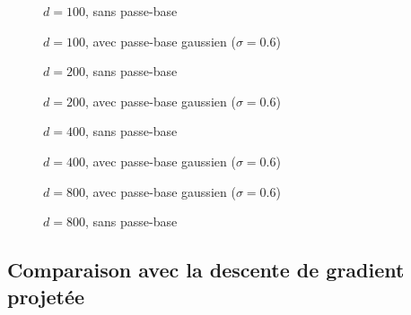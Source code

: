 \documentclass[hidelinks, french]{article} %
\theoremstyle{enonce}
\theoremstyle{special}
\theoremstyle{rq}
\theoremstyle{exo}
\theoremstyle{demo}
\begin{document}
\newpage

\begin{figure}[H]\centering
    \caption{$d=100$, sans passe-base}
    \label{fig:LGDlat100-s}
\end{figure}

\begin{figure}[H]\centering
	\caption{$d=100$, avec passe-base gaussien ($\sigma=0.6$)}
	\label{fig:LGDlat100-g}
\end{figure}

\begin{figure}[H]\centering
	\caption{$d=200$, sans passe-base}
	\label{fig:LGDlat200-s}
\end{figure}

\begin{figure}[H]\centering
	\caption{$d=200$, avec passe-base gaussien ($\sigma=0.6$)}
	\label{fig:LGDlat200-g}
\end{figure}

\begin{figure}[H]\centering
	\caption{$d=400$, sans passe-base}
	\label{fig:LGDlat400-s}
\end{figure}

\begin{figure}[H]\centering
	\caption{$d=400$, avec passe-base gaussien ($\sigma=0.6$)}
	\label{fig:LGDlat400-g}
\end{figure}

\begin{figure}[H]\centering
	\caption{$d=800$, avec passe-base gaussien ($\sigma=0.6$)}
	\label{fig:LGDlat800-s}
\end{figure}

\begin{figure}[H]\centering
	\caption{$d=800$, sans passe-base}
	\label{fig:LGDlat800-g}
\end{figure}





\newpage



\subsection{Comparaison avec la descente de gradient projetée}\label{sec:PGD}
\quad 
\end{document}
